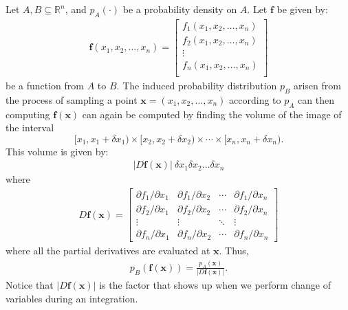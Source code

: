\documentclass[10pt]{article}
\newcommand{\ve}[1]{\mathbf{#1}}
\newcommand{\Real}{\mathbb{R}}
\begin{document}
  Let $A, B \subseteq \Real^n$, and $p_A(\cdot)$ be a probability density on $A$.  Let $\ve{f}$ be given by:
  \begin{align*}
    \ve{f}(x_1, x_2, \dotsc, x_n) = \begin{bmatrix}
      f_1(x_1, x_2, \dotsc, x_n) \\
      f_2(x_1, x_2, \dotsc, x_n) \\
      \vdots \\
      f_n(x_1, x_2, \dotsc, x_n) \\
    \end{bmatrix}
  \end{align*}
  be a function from $A$ to $B$.  The induced probability distribution $p_B$ arisen from the process of sampling a point $\ve{x} = (x_1, x_2, \dotsc, x_n)$ according to $p_A$ can then computing $\ve{f}(\ve{x})$ can again be computed by finding the volume of the image of the interval 
  $$[x_1, x_1 + \delta x_1) \times [x_2, x_2 + \delta x_2) \times \dotsb \times [x_n, x_n + \delta x_n).$$
  This volume is given by:
  \begin{align*}
    | D\ve{f}(\ve{x}) |\ \delta x_1 \delta x_2 \dotsc \delta x_n
  \end{align*}
  where 
  \begin{align*}
    D\ve{f}(\ve{x}) = \begin{bmatrix}
      \partial f_1 / \partial x_1 & \partial f_1 / \partial x_2 & \cdots & \partial f_1 / \partial x_n \\
      \partial f_2 / \partial x_1 & \partial f_2 / \partial x_2 & \cdots & \partial f_2 / \partial x_n \\
      \vdots & \vdots & \ddots & \vdots \\
      \partial f_n / \partial x_1 & \partial f_n / \partial x_2 & \cdots & \partial f_n / \partial x_n
    \end{bmatrix}
  \end{align*}
  where all the partial derivatives are evaluated at $\ve{x}$.  Thus,
  \begin{align*}
    p_B(\ve{f}(\ve{x})) = \frac{p_A(\ve{x})}{|D\ve{f}(\ve{x})|}.
  \end{align*}
  Notice that $|D\ve{f}(\ve{x})|$ is the factor that shows up when we perform change of variables during an integration.
\end{document}
